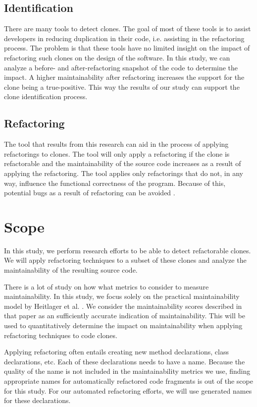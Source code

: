 \subsection{Identification}
There are many tools to detect clones. The goal of most of these tools is to assist developers in reducing duplication in their code, i.e. assisting in the refactoring process. The problem is that these tools have no limited insight on the impact of refactoring such clones on the design of the software. In this study, we can analyze a before- and after-refactoring snapshot of the code to determine the impact. A higher maintainability after refactoring increases the support for the clone being a true-positive. This way the results of our study can support the clone identification process.

\subsection{Refactoring}
The tool that results from this research can aid in the process of applying refactorings to clones. The tool will only apply a refactoring if the clone is refactorable and the maintainability of the source code increases as a result of applying the refactoring. The tool applies only refactorings that do not, in any way, influence the functional correctness of the program. Because of this, potential bugs as a result of refactoring can be avoided \cite{bavota2012does}.

\section{Scope}
In this study, we perform research efforts to be able to detect refactorable clones. We will apply refactoring techniques to a subset of these clones and analyze the maintainability of the resulting source code.

There is a lot of study on how what metrics to consider to measure maintainability. In this study, we focus solely on the practical maintainability model by Heitlager et al. \cite{heitlager2007practical}. We consider the maintainability scores described in that paper as an sufficiently accurate indication of maintainability. This will be used to quantitatively determine the impact on maintainability when applying refactoring techniques to code clones.

Applying refactoring often entails creating new method declarations, class declarations, etc. Each of these declarations needs to have a name. Because the quality of the name is not included in the maintainability metrics we use, finding appropriate names for automatically refactored code fragments is out of the scope for this study. For our automated refactoring efforts, we will use generated names for these declarations.

